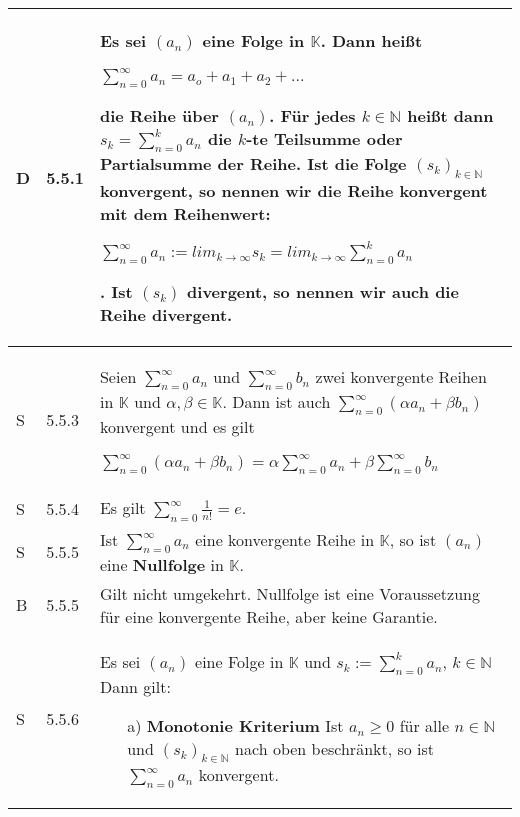     \begin{longtable}{p{0.75cm} p{1cm} p{16cm}}
        \toprule

        D & 5.5.1 &     Es sei $(a_n)$ eine Folge in $\mathbb{K}$. Dann heißt \hfill \break
                        \centerline{$\sum^{\infty}_{n=0} a_n = a_o + a_1 + a_2 + ... $}
                        die \textbf{Reihe} über $(a_n)$. \hfill \break
                        Für jedes $k \in \mathbb{N}$ heißt dann $s_k = \sum^{k}_{n=0} a_n$ die $k$-te Teilsumme oder \textbf{Partialsumme} der Reihe. \hfill \break
                        Ist die Folge $(s_k)_{k \in \mathbb{N}}$ konvergent, so nennen wir die Reihe \textbf{konvergent} mit dem Reihenwert: \hfill \break
                        \centerline{$\sum^{\infty}_{n=0} a_n := lim_{k \rightarrow \infty} s_k = lim_{k \rightarrow \infty} \sum^{k}_{n=0} a_n$}.
                        Ist $(s_k)$ divergent, so nennen wir auch die Reihe divergent.  \\
        \midrule
        S   & 5.5.3 &   Seien $\sum^{\infty}_{n=0} a_n$ und $\sum^{\infty}_{n=0} b_n$ zwei konvergente Reihen in $\mathbb{K}$ und 
                        $\alpha, \beta \in \mathbb{K}$. Dann ist auch $\sum^{\infty}_{n=0} (\alpha a_n + \beta b_n)$ konvergent und es gilt \hfill \break
                        \centerline{$\sum^{\infty}_{n=0} (\alpha a_n + \beta b_n) = \alpha \sum^{\infty}_{n=0} a_n + \beta \sum^{\infty}_{n=0} b_n$}  \\
        \midrule
        S   & 5.5.4 &   Es gilt $\sum^{\infty}_{n=0} \frac{1}{n!} = e$. \\
        \midrule
        S   & 5.5.5 &   Ist $\sum^{\infty}_{n=0} a_n$ eine konvergente Reihe in $\mathbb{K}$, so ist $(a_n)$ eine \textbf{Nullfolge} in $\mathbb{K}$. \\
        \midrule
        B   & 5.5.5 &   Gilt nicht umgekehrt. Nullfolge ist eine Voraussetzung für eine konvergente Reihe, aber keine Garantie. \\
        \midrule
        S   & 5.5.6 &   Es sei $(a_n)$ eine Folge in $\mathbb{K}$ und $s_k := \sum^{k}_{n=0} a_n$, $k \in \mathbb{N}$ Dann gilt:
                        \begin{itemize}[topsep=-0.5cm]
                            \item[a)] \textbf{Monotonie Kriterium} \hfill \break
                                        Ist $a_n \geq 0$ für alle $n \in \mathbb{N}$ und $(s_k)_{k \in \mathbb{N}}$ nach oben beschränkt, so
                                        ist $\sum^{\infty}_{n=0} a_n$ konvergent.

\end{itemize}
\end{longtable}
